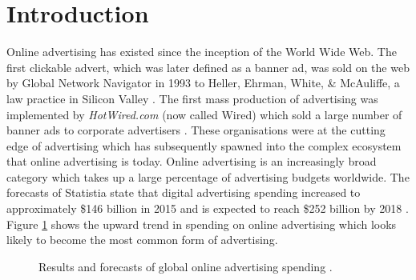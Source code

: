\documentclass[12pt]{article}
\begin{document}
\section{Introduction}
Online advertising has existed since the inception of the World Wide Web. The first clickable advert, which was later defined as a banner ad, was sold on the web by Global Network Navigator in 1993 to Heller, Ehrman, White, \& McAuliffe, a law practice in Silicon Valley \parencite{oreilly}. The first mass production of advertising was implemented by \textit{HotWired.com} (now called Wired) which sold a large number of banner ads to corporate advertisers \parencite{firstAd}. These organisations were at the cutting edge of advertising which has subsequently spawned into the complex ecosystem that online advertising is today. Online advertising is an increasingly broad category which takes up a large percentage of advertising budgets worldwide. The forecasts of Statistia state that digital advertising spending increased to approximately \$146 billion in 2015 and is expected to reach \$252 billion by 2018 \parencite{Statistia}. Figure \ref{fig:M1} shows the upward trend in spending on online advertising which looks likely to become the most common form of advertising.   \\

\begin{figure} [H]
    \centering
    \caption{Results and forecasts of global online advertising spending \parencite{Statistia}.} \label{fig:M1}
\end{figure}
\end{document}
